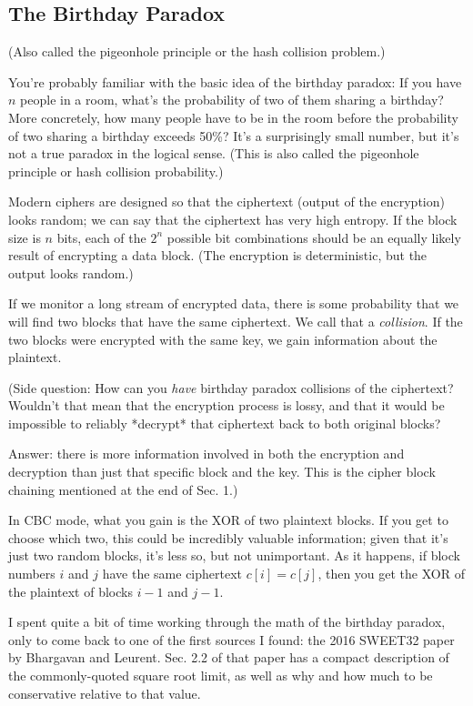 \documentclass[%
 aip,
 jmp,%
 amsmath,amssymb,
 reprint,%
]{revtex4-1}
\begin{document}
\subsection{The Birthday Paradox}

(Also called the pigeonhole principle or the hash collision problem.)

You're probably familiar with the basic idea of the birthday paradox:
If you have $n$ people in a room, what's the probability of two of
them sharing a birthday?  More concretely, how many people have to be
in the room before the probability of two sharing a birthday exceeds
50\%?  It's a surprisingly small number, but it's not a true paradox in
the logical sense.  (This is also called the pigeonhole principle or
hash collision probability.)

Modern ciphers are designed so that the ciphertext (output of the
encryption) looks random; we can say that the ciphertext has very high
entropy.  If the block size is $n$ bits, each of the $2^n$ possible
bit combinations should be an equally likely result of encrypting a
data block.  (The encryption is deterministic, but the output looks
random.)

If we monitor a long stream of encrypted data, there is some
probability that we will find two blocks that have the same
ciphertext.  We call that a \emph{collision}.  If the two blocks were
encrypted with the same key, we gain information about the plaintext.

(Side question: How can you \emph{have} birthday paradox collisions of the
ciphertext?  Wouldn't that mean that the encryption process is lossy,
and that it would be impossible to reliably *decrypt* that ciphertext
back to both original blocks?

Answer: there is more information involved in both the encryption and
decryption than just that specific block and the key.  This is the
cipher block chaining mentioned at the end of Sec. 1.)

In CBC mode, what you gain is the XOR of two plaintext blocks.  If you
get to choose which two, this could be incredibly valuable
information; given that it's just two random blocks, it's less so, but
not unimportant.  As it happens, if block numbers $i$ and $j$ have the
same ciphertext $c[i] = c[j]$, then you get the XOR of the plaintext of
blocks $i-1$ and $j-1$.

I spent quite a bit of time working through the math of the birthday
paradox, only to come back to one of the first sources I found: the
2016 SWEET32 paper by Bhargavan and Leurent.  Sec. 2.2 of that paper
has a compact description of the commonly-quoted square root limit, as
well as why and how much to be conservative relative to that value.
\end{document}
